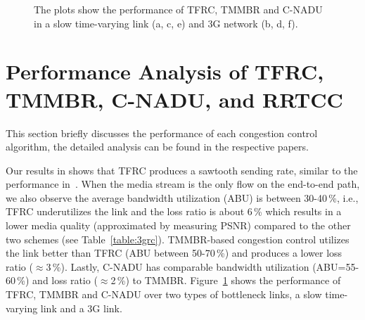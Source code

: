 \begin{figure}[!t]
  \centerline{
  }
  \centerline{
  }
  \centerline{
  }
  \caption{The plots show the performance of TFRC, TMMBR and C-NADU in a slow
  time-varying link (a, c, e) and 3G network (b, d, f).}
  \label{fig:3grc}
\end{figure}


\begin{table}[!t]
\caption{Comparing TFRC, TMMBR, C-NADU for calls over mobile nodes (180s
simulations using 3G traces).}
\label{table:3grc}
\end{table}

\section{Performance Analysis of TFRC, TMMBR, C-NADU, and RRTCC}

This section briefly discusses the performance of each congestion control
algorithm, the detailed analysis can be found in the respective papers.

Our results in  shows that TFRC produces a sawtooth sending
rate, similar to the performance in~\cite{saurin:2006:thesis}. When the media
stream is the only flow on the end-to-end path, we also observe the average
bandwidth utilization (ABU) is between 30-40\,\%, i.e., TFRC underutilizes the
link and the loss ratio is about 6\,\% which results in a lower media quality
(approximated by measuring PSNR) compared to the other two schemes (see
Table~\ref{table:3grc}). TMMBR-based congestion control utilizes the link
better than TFRC (ABU between 50-70\,\%) and produces a lower loss ratio
($\approx$3\,\%). Lastly, C-NADU has comparable bandwidth utilization
(ABU=55-60\,\%) and loss ratio ($\approx$2\,\%) to TMMBR.
Figure~\ref{fig:3grc} shows the performance of TFRC, TMMBR and C-NADU over two
types of bottleneck links, a slow time-varying link and a 3G link.


